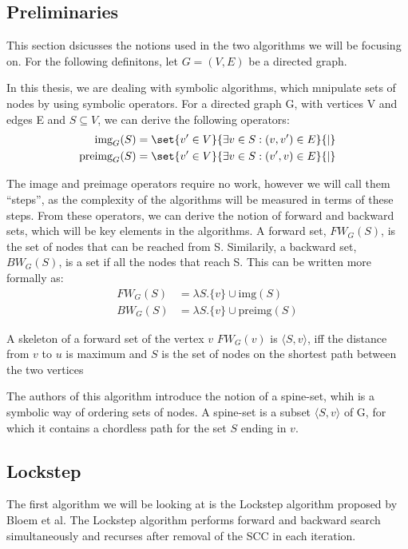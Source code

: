 \documentclass[../master.tex]{subfiles}
\newcommand{\FW}[2][G]{\ensuremath{FW_{#1}(#2)}}
\newcommand{\BW}[2][G]{\ensuremath{BW_{#1}(#2)}}
\newcommand{\pair}[2]{\ensuremath{\langle #1, #2\rangle}}
\newcommand{\img}[2][G]{\ensuremath{\text{img}_{#1}(#2)}}
\newcommand{\pre}[2][G]{\ensuremath{\text{preimg}_{#1}(#2)}}
\begin{document}
\subsection{Preliminaries}

This section dsicusses the notions used in the two algorithms we will be focusing on. For the following definitons, let $G=(V,E)$ be a directed graph.

In this thesis, we are dealing with symbolic algorithms, which mnipulate sets of nodes by using symbolic operators. For a directed graph G, with vertices V and edges E and $S\subseteq V$, we can derive the following operators:
\begin{align*}
\img S &= \set{v' \in V}{\exists v\in S:(v, v')\in E}{|}\\
\pre S &= \set{v' \in V}{\exists v\in S:(v', v)\in E}{|}
\end{align*}

The image and preimage operators require no work, however we will call them ``steps'', as the complexity of the algorithms will be measured in terms of these steps.
From these operators, we can derive the notion of forward and backward sets, which will be key elements in the algorithms. A forward set, \FW{S}, is the set of nodes that can be reached from S. Similarily, a backward set, \BW{S}, is a set if all the nodes that reach S. This can be written more formally as:
\begin{align*}
\FW{S} &= \lambda S.\{v\}\cup \text{img}(S)\\
\BW{S} &= \lambda S.\{v\}\cup \text{preimg}(S)
\end{align*}

A skeleton of a forward set of the vertex $v$ \FW{v} is \pair{S}{v}, iff the distance from $v$ to $u$ is maximum and $S$ is the set of nodes on the shortest path between the two vertices

The authors of this algorithm introduce the notion of a spine-set, whih is a symbolic way of ordering sets of nodes. A spine-set is a subset \pair{S}{v} of G, for which it contains a chordless path for the set $S$ ending in $v$.

\subsection{Lockstep}
The first algorithm we will be looking at is the Lockstep algorithm proposed by Bloem et al. \cite{lockstep} The Lockstep algorithm performs forward and backward search simultaneously and recurses after removal of the SCC in each iteration.
\end{document}
